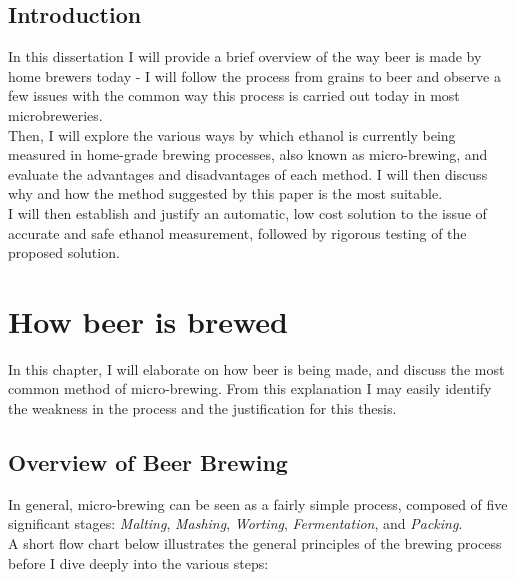 \documentclass[twoside]{ctuthesis}
\theoremstyle{plain}
\theoremstyle{definition}
\theoremstyle{note}
\begin{document}
\maketitle

\section{Introduction}

In this dissertation I will provide a brief overview of the way beer is made by home brewers today - I will follow the process from grains to beer and observe a few issues with the common way this process is carried out today in most microbreweries.\\
Then, I will explore the various ways by which ethanol is currently being measured in home-grade brewing processes, also known as micro-brewing, and evaluate the advantages and disadvantages of each method. I will then discuss why and how the method suggested by this paper is the most suitable.\\
I will then establish and justify an automatic, low cost solution to the issue of accurate and safe ethanol measurement, followed by rigorous testing of the proposed solution.

\chapter{How beer is brewed}

In this chapter, I will elaborate on how beer is being made, and discuss the most common method of micro-brewing.
From this explanation I may easily identify the weakness in the process and the justification for this thesis.

\section{Overview of Beer Brewing}
In general, micro-brewing can be seen as a fairly simple process, composed of five significant stages: \textit{Malting}, \textit{Mashing}, \textit{Worting}, \textit{Fermentation}, and \textit{Packing}.\\
A short flow chart below illustrates the general principles of the brewing process before I dive deeply into the various steps:
\end{document}
